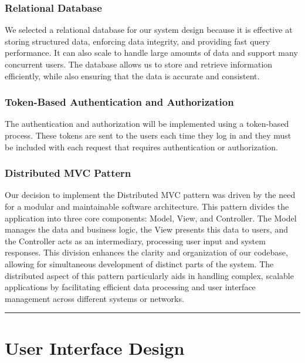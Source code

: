 \documentclass{Configuration_Files/Template}
\begin{document}
\subsection{Relational Database}

We selected a relational database for our system design because it is effective at storing structured data, enforcing data integrity, and providing fast query performance. It can also scale to handle large amounts of data and support many concurrent users. The database allows us to store and retrieve information efficiently, while also ensuring that the data is accurate and consistent.

\subsection{Token-Based Authentication and Authorization}

The authentication and authorization will be implemented using a token-based process. These tokens are sent to the users each time they log in and they must be included with each request that requires authentication or authorization.

\subsection{Distributed MVC Pattern}

Our decision to implement the Distributed MVC pattern was driven by the need for a modular and maintainable software architecture. This pattern divides the application into three core components: Model, View, and Controller. The Model manages the data and business logic, the View presents this data to users, and the Controller acts as an intermediary, processing user input and system responses. This division enhances the clarity and organization of our codebase, allowing for simultaneous development of distinct parts of the system. The distributed aspect of this pattern particularly aids in handling complex, scalable applications by facilitating efficient data processing and user interface management across different systems or networks.

{\color{bluepoli}\rule{\linewidth}{0.1pt}}

\chapter{User Interface Design}
\end{document}

